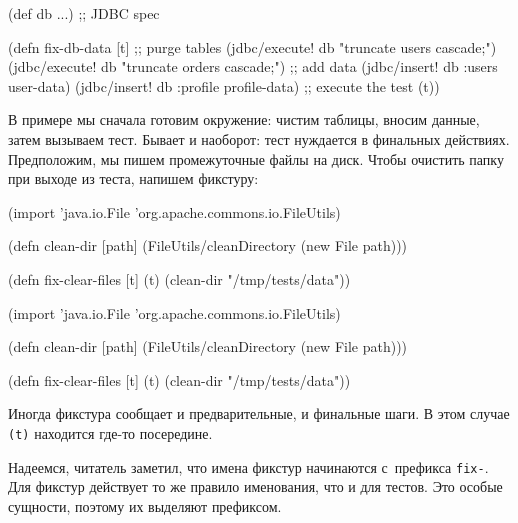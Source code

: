 \else

\begin{english}
  \begin{clojure}
(def db {...}) ;; JDBC spec

(defn fix-db-data [t]
  ;; purge tables
  (jdbc/execute! db "truncate users cascade;")
  (jdbc/execute! db "truncate orders cascade;")
  ;; add data
  (jdbc/insert! db :users user-data)
  (jdbc/insert! db :profile profile-data)
  ;; execute the test
  (t))
  \end{clojure}
\end{english}

\fi

В примере мы сначала готовим окружение: чистим таблицы, вносим данные, затем
вызываем тест. Бывает и наоборот: тест нуждается в финальных
действиях. Предположим, мы пишем промежуточные файлы на диск. Чтобы очистить
папку при выходе из теста, напишем фикстуру:

\ifx\devicetype\mobile

\begin{english}
  \begin{clojure}
(import 'java.io.File
        'org.apache.commons.io.FileUtils)

(defn clean-dir [path]
  (FileUtils/cleanDirectory
    (new File path)))

(defn fix-clear-files [t]
  (t)
  (clean-dir "/tmp/tests/data"))
  \end{clojure}
\end{english}

\else

\begin{english}
  \begin{clojure}
(import 'java.io.File
        'org.apache.commons.io.FileUtils)

(defn clean-dir [path]
  (FileUtils/cleanDirectory (new File path)))

(defn fix-clear-files [t]
  (t)
  (clean-dir "/tmp/tests/data"))
  \end{clojure}
\end{english}

\fi

Иногда фикстура сообщает и предварительные, и финальные шаги. В этом случае
\verb|(t)| находится где-то посередине.

Надеемся, читатель заметил, что имена фикстур начинаются с~префикса
\verb|fix-|. Для фикстур действует то же правило именования, что и для
тестов. Это особые сущности, поэтому их выделяют префиксом.


